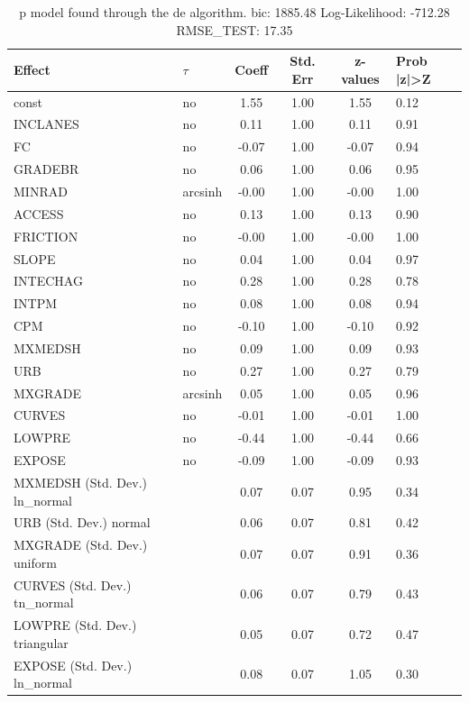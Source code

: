 \begin{table}
	\caption{p model found through the de algorithm. bic: 1885.48 Log-Likelihood: -712.28 RMSE_TEST: 17.35}
	\begin{center}
		\begin{tabular}{|l|l|c|c|c|l|}
			\hline
			Effect & $\tau$ & Coeff & Std. Err & z-values & Prob |z|>Z \\
			\hline
			const & no & 1.55 & 1.00 & 1.55 & 0.12 \\
			\hline
			INCLANES & no & 0.11 & 1.00 & 0.11 & 0.91 \\
			\hline
			FC & no & -0.07 & 1.00 & -0.07 & 0.94 \\
			\hline
			GRADEBR & no & 0.06 & 1.00 & 0.06 & 0.95 \\
			\hline
			MINRAD & arcsinh & -0.00 & 1.00 & -0.00 & 1.00 \\
			\hline
			ACCESS & no & 0.13 & 1.00 & 0.13 & 0.90 \\
			\hline
			FRICTION & no & -0.00 & 1.00 & -0.00 & 1.00 \\
			\hline
			SLOPE & no & 0.04 & 1.00 & 0.04 & 0.97 \\
			\hline
			INTECHAG & no & 0.28 & 1.00 & 0.28 & 0.78 \\
			\hline
			INTPM & no & 0.08 & 1.00 & 0.08 & 0.94 \\
			\hline
			CPM & no & -0.10 & 1.00 & -0.10 & 0.92 \\
			\hline
			MXMEDSH & no & 0.09 & 1.00 & 0.09 & 0.93 \\
			\hline
			URB & no & 0.27 & 1.00 & 0.27 & 0.79 \\
			\hline
			MXGRADE & arcsinh & 0.05 & 1.00 & 0.05 & 0.96 \\
			\hline
			CURVES & no & -0.01 & 1.00 & -0.01 & 1.00 \\
			\hline
			LOWPRE & no & -0.44 & 1.00 & -0.44 & 0.66 \\
			\hline
			EXPOSE & no & -0.09 & 1.00 & -0.09 & 0.93 \\
			\hline
			MXMEDSH (Std. Dev.) ln_normal &  & 0.07 & 0.07 & 0.95 & 0.34 \\
			\hline
			URB (Std. Dev.) normal &  & 0.06 & 0.07 & 0.81 & 0.42 \\
			\hline
			MXGRADE (Std. Dev.) uniform &  & 0.07 & 0.07 & 0.91 & 0.36 \\
			\hline
			CURVES (Std. Dev.) tn_normal &  & 0.06 & 0.07 & 0.79 & 0.43 \\
			\hline
			LOWPRE (Std. Dev.) triangular &  & 0.05 & 0.07 & 0.72 & 0.47 \\
			\hline
			EXPOSE (Std. Dev.) ln_normal &  & 0.08 & 0.07 & 1.05 & 0.30 \\
			\hline
		\end{tabular}
	\end{center}
\end{table}